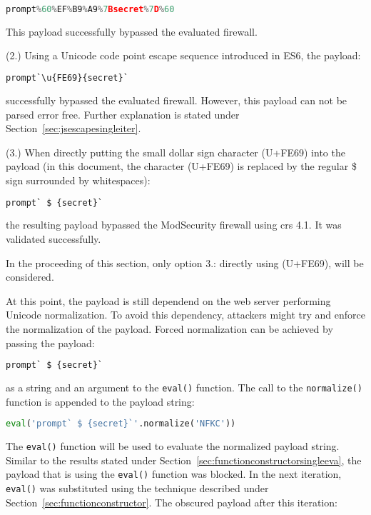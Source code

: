 \begin{lstlisting}[style=basicStyle, language=Python]
prompt%60%EF%B9%A9%7Bsecret%7D%60
\end{lstlisting}
This payload successfully bypassed the evaluated firewall.

(2.) Using a Unicode code point escape sequence introduced in ES6, the payload:

\begin{lstlisting}[style=basicStyle, language=Python]
prompt`\u{FE69}{secret}`
\end{lstlisting}
successfully bypassed the evaluated firewall. However, this payload can not be parsed error free. Further explanation is stated under Section~\ref{sec:jsescapesingleiter}.

(3.) When directly putting the small dollar sign character (U+FE69) into the payload (in this document, the character (U+FE69) is replaced by the regular \$ sign surrounded by whitespaces):

\begin{lstlisting}[style=basicStyle, language=Python]
prompt` $ {secret}`
\end{lstlisting}
the resulting payload bypassed the ModSecurity firewall using \acrshort{crs} 4.1. It was validated successfully.

In the proceeding of this section, only option 3.: directly using (U+FE69), will be considered. 

At this point, the payload is still dependend on the web server performing Unicode normalization. To avoid this dependency, attackers might try and enforce the normalization of the payload. Forced normalization can be achieved by passing the payload:

\begin{lstlisting}[style=basicStyle, language=Python]
prompt` $ {secret}`
\end{lstlisting}
as a string and an argument to the \verb|eval()| function. The call to the \verb|normalize()| function is appended to the payload string:

\begin{lstlisting}[style=basicStyle, language=Python]
eval('prompt` $ {secret}`'.normalize('NFKC'))
\end{lstlisting}
The \verb|eval()| function will be used to evaluate the normalized payload string. Similar to the results stated under Section~\ref{sec:functionconstructorsingleeva}, the payload that is using the \verb|eval()| function was blocked. In the next iteration, \verb|eval()| was substituted using the technique described under Section~\ref{sec:functionconstructor}. The obscured payload after this iteration:

